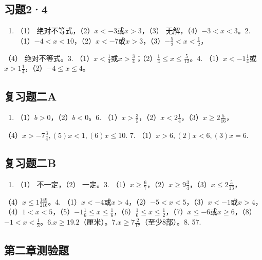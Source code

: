 \subsection{习题2·4}

\begin{enumerate}
\item
  （1） 绝对不等式，（2）\(x < -3\)或\(x > 3\)，（3）
  无解，（4）\(-3 < x < 3\)。2.
  （1）\(-4 < x < 10\)，（2）\(x < -7\)或\(x > 3\)，（3）\(-\frac{5}{2} < x < \frac{1}{2}\)，
\end{enumerate}

（4） 绝对不等式。3.
（1）\(x < \frac{1}{4}\)或\(x > \frac{3}{4}\)；（2）\(\frac{1}{4} \leqslant x \leqslant \frac{5}{12}\)。4.
（1）\(x < -1\frac{1}{4}\)或\(x > 1\frac{1}{4}\)，（2）\(-4 \leqslant x \leqslant 4\)。

\subsection{复习题二A}

\begin{enumerate}[start=4]
\item
  （1）\(b > 0\)，（2）\(b < 0\)。6.
  （1）\(x > \frac{3}{5}\)，（2）\(x < 2\frac{1}{4}\)，（3）\(x \geqslant 2\frac{5}{16}\)，
\end{enumerate}

（4）\(x > -7\frac{3}{4}, (5)x < 1, (6)x \leqslant 10.\) 7.
（1）\(x > 6, (2)x < 6, (3)x = 6.\)

\subsection{复习题二B}

\begin{enumerate}
\item
  （1） 不一定，（2） 一定。3.
  （1）\(x \geqslant \frac{6}{7}\)，（2）\(x \geqslant 9\frac{3}{4}\)，（3）\(x \leqslant 2\frac{5}{13}\)，
\end{enumerate}

（4）\(x \leqslant 1\frac{149}{216}\)。4.
（1）\(x < -4\)或\(x > 4\)，（2）\(-5 < x < 5\)，（3）\(x < -1\)或\(x > 4\)，（4）\(1 < x < 5\)，（5）\(-1\frac{1}{6} \leqslant x \leqslant \frac{1}{6}\)，（6）\(\frac{1}{6} \leqslant x \leqslant \frac{1}{2}\)，（7）\(x \leqslant -6\)或\(x \geqslant 6\)，（8）\(-1 < x < \frac{1}{3}\)。6.\(x \geqslant 19.2\)（厘米）。7.\(x \geqslant 7\frac{2}{17}\)（至少8部）。8.
57.

\subsection{第二章测验题}

